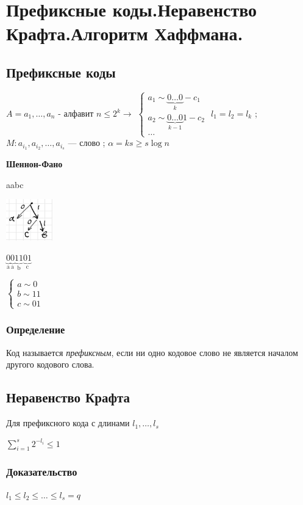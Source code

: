 \documentclass[12pt]{article}
\begin{document}
\section{Префиксные коды.Неравенство Крафта.Алгоритм Хаффмана.}
\subsection{Префиксные коды}
$A = {a_1, \dots, a_n}$ - алфавит $ n \leq2^k\rightarrow$
$\begin{cases}
        a_1  \sim \underbrace{0\dots0}_{k} - c_1      \\
        a_2  \sim \underbrace{0\dots0}_{k - 1}1 - c_2 \\
        \dots
    \end{cases}$
\newline$l_1=l_2=l_k$ ; $M:a_{i_1},a_{i_2},\dots,a_{i_s}$ — слово ; $\alpha=ks\geq s\log{n}$

\textbf{Шеннон-Фано}

aabc

\includegraphics[width=20mm]{images/tree1.png}

$\underbrace{0}_{\text{a}}\underbrace{0}_{\text{a}}\underbrace{11}_{\text{b}}\underbrace{01}_{\text{c}}$

$\begin{cases}
        a  \sim 0  \\
        b  \sim 11 \\
        c \sim 01
    \end{cases}$

\subsubsection{Определение}
Код называется \textit{префиксным}, если ни одно кодовое слово не является началом другого кодового слова.

\subsection{Неравенство Крафта}
Для префиксного кода с длинами $l_1,\dots,l_s$

$\sum\limits_{i=1}^s 2^{-l_i} \leq 1$
\subsubsection{Доказательство}
$l_1\leq l_2 \leq \dots \leq l_s=q$
\end{document}
